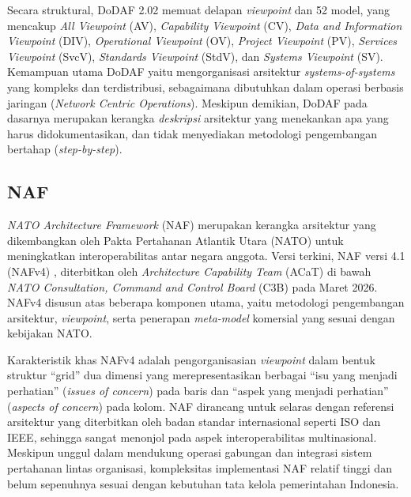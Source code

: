 Secara struktural, DoDAF 2.02 memuat delapan \textit{viewpoint} dan 52 model, yang mencakup \textit{All Viewpoint} (AV), \textit{Capability Viewpoint} (CV), \textit{Data and Information Viewpoint} (DIV), \textit{Operational Viewpoint} (OV), \textit{Project Viewpoint} (PV), \textit{Services Viewpoint} (SvcV), \textit{Standards Viewpoint} (StdV), dan \textit{Systems Viewpoint} (SV).
Kemampuan utama DoDAF yaitu mengorganisasi arsitektur \textit{systems-of-systems} yang kompleks dan terdistribusi, sebagaimana dibutuhkan dalam operasi berbasis jaringan (\textit{Network Centric Operations}).
Meskipun demikian, DoDAF pada dasarnya merupakan kerangka \textit{deskripsi} arsitektur yang menekankan apa yang harus didokumentasikan, dan tidak menyediakan metodologi pengembangan bertahap (\textit{step-by-step}).

\subsection{NAF}
\textit{NATO Architecture Framework} (NAF) merupakan kerangka arsitektur yang dikembangkan oleh Pakta Pertahanan Atlantik Utara (NATO) untuk meningkatkan interoperabilitas antar negara anggota.
Versi terkini, NAF versi 4.1 (NAFv4) \autocite{NAFv4}, diterbitkan oleh \textit{Architecture Capability Team} (ACaT) di bawah \textit{NATO Consultation, Command and Control Board} (C3B) pada Maret 2026.
NAFv4 disusun atas beberapa komponen utama, yaitu metodologi pengembangan arsitektur, \textit{viewpoint}, serta penerapan \textit{meta-model} komersial yang sesuai dengan kebijakan NATO.

Karakteristik khas NAFv4 adalah pengorganisasian \textit{viewpoint} dalam bentuk struktur ``grid'' dua dimensi yang merepresentasikan berbagai ``isu yang menjadi perhatian'' (\textit{issues of concern}) pada baris dan ``aspek yang menjadi perhatian'' (\textit{aspects of concern}) pada kolom.
NAF dirancang untuk selaras dengan referensi arsitektur yang diterbitkan oleh badan standar internasional seperti ISO dan IEEE, sehingga sangat menonjol pada aspek interoperabilitas multinasional.
Meskipun unggul dalam mendukung operasi gabungan dan integrasi sistem pertahanan lintas organisasi, kompleksitas implementasi NAF relatif tinggi dan belum sepenuhnya sesuai dengan kebutuhan tata kelola pemerintahan Indonesia.

